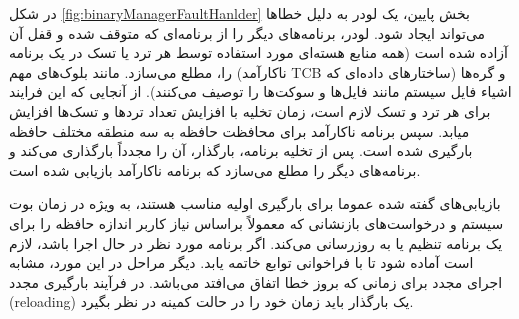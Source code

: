 \documentclass[10pt, a4paper]{article}
\begin{document}
در شکل \ref{fig:binaryManagerFaultHanlder} بخش پایین، یک لودر به دلیل خطاها
می‌تواند ایجاد شود. لودر، برنامه‌های دیگر را از برنامه‌ای که متوقف شده و قفل آن
آزاده شده است (همه منابع هسته‌ای مورد استفاده توسط هر ترد یا تسک در یک برنامه
ناکارآمد) را، مطلع می‌سازد. مانند بلوک‌های مهم TCB و گره‌ها (ساختار‌های داده‌ای
که اشیاء فایل سیستم مانند فایل‌ها و سوکت‌ها را توصیف می‌کنند). از آنجایی که این
فرایند برای هر ترد و تسک لازم است، زمان تخلیه با افزایش تعداد ترد‌ها و تسک‌ها
افزایش میابد. سپس برنامه ناکارآمد برای محافظت حافظه به سه منطقه مختلف حافظه
بارگیری شده است. پس از تخلیه برنامه، بارگذار، آن را مجدداً بارگذاری می‌کند و
برنامه‌های دیگر را مطلع می‌سازد که برنامه ناکارآمد بازیابی شده است.

بازیابی‌های گفته شده عموما برای بارگیری اولیه مناسب هستند، به ویژه در زمان بوت 
سیستم و درخواست‌های بازنشانی که معمولاً براساس نیاز کاربر اندازه حافظه را برای
یک برنامه تنظیم یا به روزرسانی می‌کند. اگر برنامه مورد نظر در حال اجرا باشد،
لازم است آماده شود تا با فراخوانی توابع  خاتمه یابد. دیگر مراحل در
این مورد، مشابه اجرای مجدد برای زمانی که بروز خطا اتفاق می‌افتد می‌باشد. در
فرآیند بارگیری مجدد (reloading) یک بارگذار باید زمان خود را در حالت کمینه در نظر
بگیرد. 

\newpage


\end{document}
